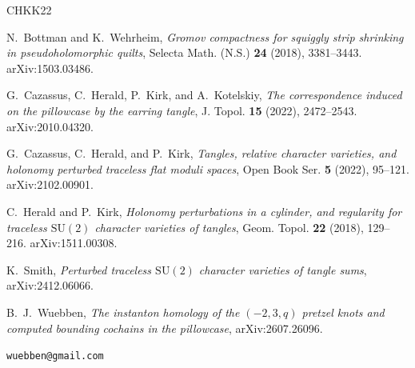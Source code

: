 \documentclass[11pt,reqno]{amsart}
\theoremstyle{plain}
\theoremstyle{definition}
\begin{document}
\raggedright
\begin{thebibliography}{CHKK22}

N.~Bottman and K.~Wehrheim,
\emph{Gromov compactness for squiggly strip shrinking in pseudoholomorphic quilts},
Selecta Math. (N.S.) \textbf{24} (2018), 3381--3443. arXiv:1503.03486.

G.~Cazassus, C.~Herald, P.~Kirk, and A.~Kotelskiy,
\emph{The correspondence induced on the pillowcase by the earring tangle},
J. Topol. \textbf{15} (2022), 2472--2543. arXiv:2010.04320.

G.~Cazassus, C.~Herald, and P.~Kirk,
\emph{Tangles, relative character varieties, and holonomy perturbed traceless flat moduli spaces},
Open Book Ser. \textbf{5} (2022), 95--121. arXiv:2102.00901.

C.~Herald and P.~Kirk,
\emph{Holonomy perturbations in a cylinder, and regularity for traceless
$\mathrm{SU}(2)$ character varieties of tangles},
Geom. Topol. \textbf{22} (2018), 129--216. arXiv:1511.00308.

K.~Smith,
\emph{Perturbed traceless $\mathrm{SU}(2)$ character varieties of tangle sums},
arXiv:2412.06066.

B.~J.~Wuebben,
\emph{The instanton homology of the $(-2,3,q)$ pretzel knots and computed bounding cochains in
the pillowcase},
arXiv:2607.26096.

\end{thebibliography}

\bigskip
{} \texttt{wuebben@gmail.com}
\end{document}
